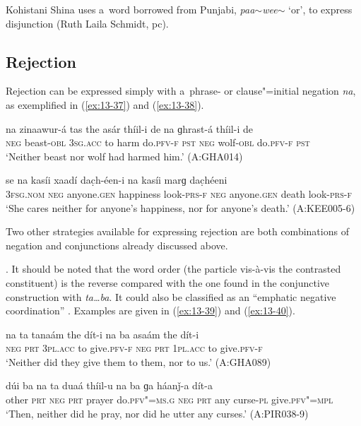 Kohistani Shina uses a~word borrowed from Punjabi, \textit{paa$\sim$wee$\sim$} `or', to express disjunction (Ruth Laila Schmidt, pc).


\subsection{Rejection}
\label{subsec:13-2-4}

 Rejection can be expressed simply with a~phrase- or clause"=initial negation \textit{na}, as exemplified in (\ref{ex:13-37}) and (\ref{ex:13-38}).

\begin{exe}
\ex
\label{ex:13-37}
\gll na zinaawur-á tas the asár thíil-i de na ɡhrast-á thíil-i de \\
\textsc{neg} beast-\textsc{obl} \textsc{3sg.acc} to harm do.\textsc{pfv-f} \textsc{pst}  \textsc{neg} wolf-\textsc{obl} do.\textsc{pfv-f} \textsc{pst} \\
\glt `Neither beast nor wolf had harmed him.' (A:GHA014)

\ex
\label{ex:13-38}
\gll se na kasíi xaadí dac̣h-éen-i na kasíi marɡ dac̣héeni \\
\textsc{3fsg.nom} \textsc{neg} anyone.\textsc{gen} happiness look-\textsc{prs-f}  \textsc{neg} anyone.\textsc{gen} death look-\textsc{prs-f}  \\
\glt `She cares neither for anyone's happiness, nor for anyone's death.' (A:KEE005-6) 
\end{exe}

Two other strategies available for expressing rejection are both combinations of negation and conjunctions already discussed above.


. It should be noted that the word order (the particle vis-à-vis the contrasted constituent) is the reverse compared with the one found in the conjunctive construction with \textit{ta{\ldots}ba}. It could also be classified as an ``emphatic negative coordination'' \citep[17--19]{haspelmath2007}. Examples are given in (\ref{ex:13-39}) and (\ref{ex:13-40}).

\begin{exe}
\ex
\label{ex:13-39}
\gll na ta tanaám the dít-i na ba asaám the dít-i \\
\textsc{neg} \textsc{prt} \textsc{3pl.acc} to give.\textsc{pfv-f} \textsc{neg} \textsc{prt} \textsc{1pl.acc} to give.\textsc{pfv-f}  \\
\glt `Neither did they give them to them, nor to us.' (A:GHA089)

\ex
\label{ex:13-40}
\gll dúi ba na ta duaá thíil-u na ba ɡa háanǰ-a dít-a \\
other \textsc{prt} \textsc{neg} \textsc{prt} prayer do.\textsc{pfv"=ms.g} \textsc{neg} \textsc{prt} any curse-\textsc{pl} give.\textsc{pfv"=mpl}\\
\glt `Then, neither did he pray, nor did he utter any curses.' (A:PIR038-9) 
\end{exe}

